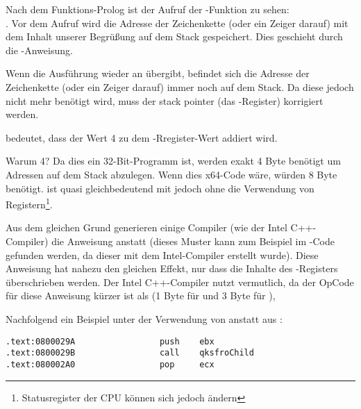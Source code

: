 Nach dem Funktions-Prolog ist der Aufruf der \printf{}-Funktion zu sehen:\\
.
Vor dem Aufruf wird die Adresse der Zeichenkette (oder ein Zeiger darauf) mit dem Inhalt unserer Begrüßung
auf dem Stack gespeichert. Dies geschieht durch die \PUSH-Anweisung.

Wenn \printf die Ausführung wieder an \main übergibt, befindet sich die Adresse der Zeichenkette (oder ein Zeiger darauf) immer noch auf dem Stack.
Da diese jedoch nicht mehr benötigt wird, muss der \gls{stack pointer} (das \ESP-Register) korrigiert werden.

 bedeutet, dass der Wert 4 zu dem \ESP-Rregister-Wert addiert wird.

Warum 4? Da dies ein 32-Bit-Programm ist, werden exakt 4 Byte benötigt um Adressen auf dem Stack abzulegen. Wenn dies x64-Code wäre, würden 8 Byte benötigt.
 ist quasi gleichbedeutend mit  jedoch ohne die Verwendung von Registern\footnote{Statusregister der CPU können sich jedoch ändern}.

\myindex{\oracle}

Aus dem gleichen Grund generieren einige Compiler (wie der Intel C++-Compiler) die Anweisung 
anstatt \ADD (dieses Muster kann zum Beispiel im \oracle{}-Code gefunden werden, da dieser mit dem Intel-Compiler erstellt wurde).
Diese Anweisung hat nahezu den gleichen Effekt, nur dass die Inhalte des \ECX-Registers überschrieben werden.
Der Intel C++-Compiler nutzt  vermutlich, da der OpCode für diese Anweisung kürzer ist als  (1 Byte für  und 3 Byte für ),

Nachfolgend ein Beispiel unter der Verwendung von \POP anstatt \ADD aus \oracle{}:

\begin{lstlisting}[caption=\oracle 10.2 Linux (app.o file),style=customasmx86]
.text:0800029A                 push    ebx
.text:0800029B                 call    qksfroChild
.text:080002A0                 pop     ecx
\end{lstlisting}



